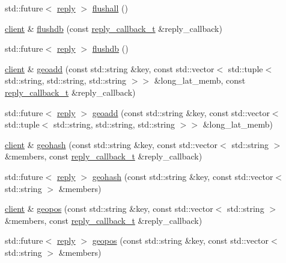 \begin{DoxyCompactItemize}
\item 
std\+::future$<$ \hyperlink{classcpp__redis_1_1reply}{reply} $>$ \hyperlink{classcpp__redis_1_1client_a78f879507f060ba538de5db80a5e3009}{flushall} ()
\item 
\hyperlink{classcpp__redis_1_1client}{client} \& \hyperlink{classcpp__redis_1_1client_a8334064cd300cb19f0760ad7c4c84673}{flushdb} (const \hyperlink{classcpp__redis_1_1client_a061a1140d36d2eaeda82b09a0bb3f9f2}{reply\+\_\+callback\+\_\+t} \&reply\+\_\+callback)
\item 
std\+::future$<$ \hyperlink{classcpp__redis_1_1reply}{reply} $>$ \hyperlink{classcpp__redis_1_1client_acd8cea192338f42f601ea8fce5c8048c}{flushdb} ()
\item 
\hyperlink{classcpp__redis_1_1client}{client} \& \hyperlink{classcpp__redis_1_1client_acb21c6730ed40799cef06315db231409}{geoadd} (const std\+::string \&key, const std\+::vector$<$ std\+::tuple$<$ std\+::string, std\+::string, std\+::string $>$$>$ \&long\+\_\+lat\+\_\+memb, const \hyperlink{classcpp__redis_1_1client_a061a1140d36d2eaeda82b09a0bb3f9f2}{reply\+\_\+callback\+\_\+t} \&reply\+\_\+callback)
\item 
std\+::future$<$ \hyperlink{classcpp__redis_1_1reply}{reply} $>$ \hyperlink{classcpp__redis_1_1client_a6e4bebc3a7935bd749f2b4a6bfbb6c22}{geoadd} (const std\+::string \&key, const std\+::vector$<$ std\+::tuple$<$ std\+::string, std\+::string, std\+::string $>$$>$ \&long\+\_\+lat\+\_\+memb)
\item 
\hyperlink{classcpp__redis_1_1client}{client} \& \hyperlink{classcpp__redis_1_1client_a37b20a863f276469d12dc47063d56055}{geohash} (const std\+::string \&key, const std\+::vector$<$ std\+::string $>$ \&members, const \hyperlink{classcpp__redis_1_1client_a061a1140d36d2eaeda82b09a0bb3f9f2}{reply\+\_\+callback\+\_\+t} \&reply\+\_\+callback)
\item 
std\+::future$<$ \hyperlink{classcpp__redis_1_1reply}{reply} $>$ \hyperlink{classcpp__redis_1_1client_ac421d4e696a67c1295a6b55ceaeab680}{geohash} (const std\+::string \&key, const std\+::vector$<$ std\+::string $>$ \&members)
\item 
\hyperlink{classcpp__redis_1_1client}{client} \& \hyperlink{classcpp__redis_1_1client_ae4bba1470cf357a8c4d1f8360a9c8b79}{geopos} (const std\+::string \&key, const std\+::vector$<$ std\+::string $>$ \&members, const \hyperlink{classcpp__redis_1_1client_a061a1140d36d2eaeda82b09a0bb3f9f2}{reply\+\_\+callback\+\_\+t} \&reply\+\_\+callback)
\item 
std\+::future$<$ \hyperlink{classcpp__redis_1_1reply}{reply} $>$ \hyperlink{classcpp__redis_1_1client_a8166870c7f3b6c5152eb85a233d78368}{geopos} (const std\+::string \&key, const std\+::vector$<$ std\+::string $>$ \&members)

\end{DoxyCompactItemize}
